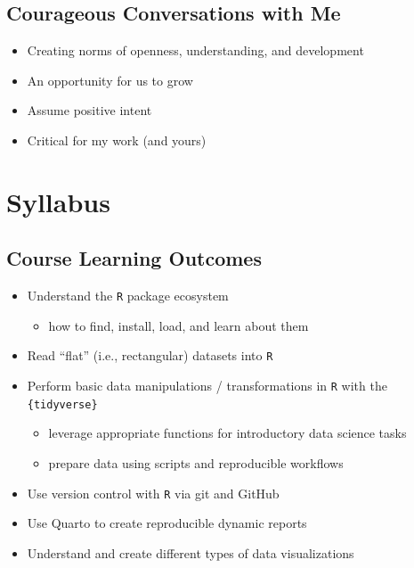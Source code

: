 \documentclass[
  letterpaper,
  DIV=11,
  numbers=noendperiod,
  oneside]{scrartcl}
\providecommand{\tightlist}{%
  \setlength{\itemsep}{0pt}\setlength{\parskip}{0pt}}\usepackage{longtable,booktabs,array}
\begin{document}
\hypertarget{courageous-conversations-with-me}{%
\subsection{Courageous Conversations with
Me}\label{courageous-conversations-with-me}}

\begin{itemize}
\tightlist
\item
  Creating norms of openness, understanding, and development
\item
  An opportunity for us to grow
\item
  Assume positive intent
\item
  Critical for my work (and yours)
\end{itemize}


\hypertarget{syllabus}{%
\section{Syllabus}\label{syllabus}}

\hypertarget{course-learning-outcomes}{%
\subsection{Course Learning Outcomes}\label{course-learning-outcomes}}

\begin{itemize}
\tightlist
\item
  Understand the \texttt{R} package ecosystem

  \begin{itemize}
  \tightlist
  \item
    how to find, install, load, and learn about them
  \end{itemize}
\item
  Read ``flat'' (i.e., rectangular) datasets into \texttt{R}
\item
  Perform basic data manipulations / transformations in \texttt{R} with
  the \texttt{\{tidyverse\}}

  \begin{itemize}
  \tightlist
  \item
    leverage appropriate functions for introductory data science tasks
  \item
    prepare data using scripts and reproducible workflows
  \end{itemize}
\item
  Use version control with \texttt{R} via git and GitHub
\item
  Use Quarto to create reproducible dynamic reports
\item
  Understand and create different types of data visualizations
\end{itemize}
\end{document}
